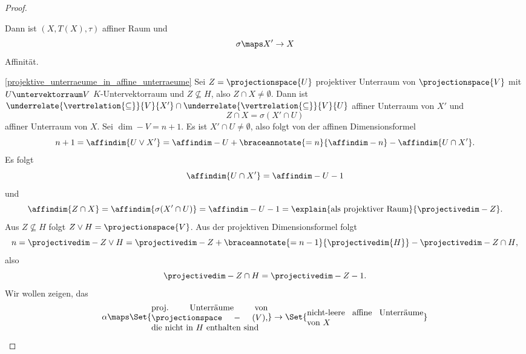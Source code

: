 \begin{proof}
\begin{proofdescription}
    Dann ist \( (X,T(X),\tau) \) affiner Raum und
    \begin{equation*}
      \sigma\maps X'\to X 
    \end{equation*}
    Affinität.
    \item[\ref{projektive_unterraeume_in_affine_unterraeume}] Sei \( Z=\projectionspace{U} \) projektiver Unterraum von \( \projectionspace{V} \) mit \( U\untervektorraum V \) \( K \)-Untervektorraum und \( Z\not\subseteq H \), also \( Z\cap X\neq \emptyset \). Dann ist \( \underrelate{\vertrelation{\subseteq}}{V}{X'}\cap  \underrelate{\vertrelation{\subseteq}}{V}{U} \) affiner Unterraum von \( X' \) und
    \begin{equation*}
      Z\cap X=\sigma(X'\cap U)
    \end{equation*}
    affiner Unterraum von \( X \).
     Sei \( \dim-{}{V}=n+1 \). Es ist \( X'\cap U\neq \emptyset \), also folgt von der affinen Dimensionsformel
    \begin{equation*}
      n+1=\affindim{U\vee X'}=\affindim-{U}+\braceannotate{=n}{\affindim-{n}}-\affindim{U\cap X'}.
    \end{equation*}
    Es folgt
    \begin{equation*}
      \affindim{U\cap X'}=\affindim-{U}-1
    \end{equation*}
    und
    \begin{equation*}
      \affindim{Z\cap X}=\affindim{\sigma(X'\cap U)}=\affindim-{U}-1=\explain{\text{als projektiver Raum}}{\projectivedim-{Z}}.
    \end{equation*}
    Aus  \( Z\not\subseteq H \) folgt \( Z\vee H=\projectionspace{V} \). Aus der projektiven Dimensionsformel folgt
    \begin{equation*}
      n=\projectivedim-{Z\vee H}=\projectivedim-{Z}+\braceannotate{=n-1}{\projectivedim{H}}-\projectivedim-{Z\cap H},
    \end{equation*}
    also
    \begin{equation*}
      \projectivedim-{Z\cap H}=\projectivedim-{Z}-1.
    \end{equation*}
    Wir wollen zeigen, das 
    \begin{equation*}
      \begin{split}
      \alpha\maps \Set{\parbox{0.4\textwidth}{proj.\ Unterräume von \( \projectionspace-{(V)} \), die nicht in \( H \) enthalten sind}}&\to \Set{\parbox{0.4\textwidth}{nicht-leere affine Unterräume von \( X \)}}\\

\end{split}
\end{equation*}
\end{proofdescription}
\end{proof}
